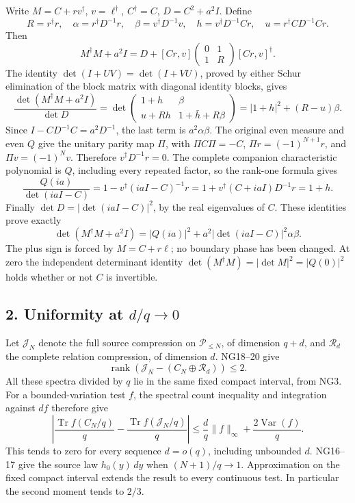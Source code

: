 Write \(M=C+rv^\dagger\), \(v=\ell^\dagger\), \(C^\dagger=C\), \(D=C^2+a^2I\). Define \[
R=r^\dagger r,\quad
\alpha=r^\dagger D^{-1}r,\quad
\beta=v^\dagger D^{-1}v,\quad
h=v^\dagger D^{-1}Cr,\quad
u=r^\dagger CD^{-1}Cr.
\] Then \[
M^\dagger M+a^2I
=D+[Cr,v]\begin{pmatrix}0&1\\1&R\end{pmatrix}[Cr,v]^\dagger.
\] The identity \(\det(I+UV)=\det(I+VU)\), proved by either Schur elimination of the block matrix with diagonal identity blocks, gives \[
\frac{\det(M^\dagger M+a^2I)}{\det D}
=\det\begin{pmatrix}1+h&\beta\\u+Rh&1+\bar h+R\beta\end{pmatrix}
=|1+h|^2+(R-u)\beta.
\] Since \(I-CD^{-1}C=a^2D^{-1}\), the last term is \(a^2\alpha\beta\). The original even measure and even \(Q\) give the unitary parity map \(\Pi\), with \(\Pi C\Pi=-C\), \(\Pi r=(-1)^{N+1}r\), and \(\Pi v=(-1)^Nv\). Therefore \(v^\dagger D^{-1}r=0\). The complete companion characteristic polynomial is \(Q\), including every repeated factor, so the rank-one formula gives \[
\frac{Q(ia)}{\det(iaI-C)}
=1-v^\dagger(iaI-C)^{-1}r
=1+v^\dagger(C+iaI)D^{-1}r=1+h.
\] Finally \(\det D=|\det(iaI-C)|^2\), by the real eigenvalues of \(C\). These identities prove exactly \[
\det(M^\dagger M+a^2I)
=|Q(ia)|^2+a^2|\det(iaI-C)|^2\alpha\beta.
\] The plus sign is forced by \(M=C+r\ell\); no boundary phase has been changed. At zero the independent determinant identity \(\det(M^\dagger M)=|\det M|^2=|Q(0)|^2\) holds whether or not \(C\) is invertible.

\subsection{\texorpdfstring{2. Uniformity at \(d/q\to0\)}{2. Uniformity at d/q\textbackslash to0}}\label{osdind:uniformity-at-dqto0}

Let \(\mathcal J_N\) denote the full source compression on \(\mathcal P_{\le N}\), of dimension \(q+d\), and \(\mathcal R_d\) the complete relation compression, of dimension \(d\). NG18--20 give \[
\operatorname{rank}\!\left(\mathcal J_N-
          (C_N\oplus\mathcal R_d)\right)\le2.
\] All these spectra divided by \(q\) lie in the same fixed compact interval, from NG3. For a bounded-variation test \(f\), the spectral count inequality and integration against \(df\) therefore give \[
\left|\frac{\operatorname{Tr}f(C_N/q)}q
       -\frac{\operatorname{Tr}f(\mathcal J_N/q)}q\right|
\le \frac d q\|f\|_\infty+\frac{2\operatorname{Var}(f)}q.
\] This tends to zero for every sequence \(d=o(q)\), including unbounded \(d\). NG16--17 give the source law \(h_0(y)\,dy\) when \((N+1)/q\to1\). Approximation on the fixed compact interval extends the result to every continuous test. In particular the second moment tends to \(2/3\).

